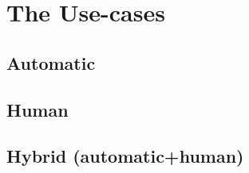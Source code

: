 
\chapter{The Use-cases}
\label{cap:cases}






\section{Automatic}
\label{sec:cases:automatic}


\section{Human}
\label{sec:cases:human}



\section{Hybrid (automatic+human)}
\label{sec:cases:hybrid}
